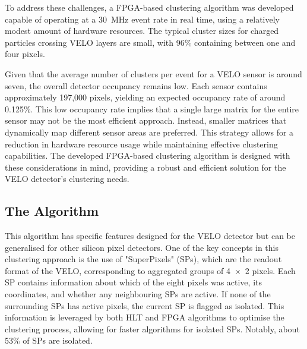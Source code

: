 To address these challenges, a FPGA-based clustering algorithm was developed capable of operating at a \SI{30}{\mega\hertz} event rate in real time, using a relatively modest amount of hardware resources. The typical cluster sizes for charged particles crossing VELO layers are small, with 96\% containing between one and four pixels. 

Given that the average number of clusters per event for a VELO sensor is around seven, the overall detector occupancy remains low. Each sensor contains approximately 197,000 pixels, yielding an expected occupancy rate of around 0.125\%\cite{Bediaga:2013tje}. This low occupancy rate implies that a single large matrix for the entire sensor may not be the most efficient approach. Instead, smaller matrices that dynamically map different sensor areas are preferred. This strategy allows for a reduction in hardware resource usage while maintaining effective clustering capabilities. The developed FPGA-based clustering algorithm is designed with these considerations in mind, providing a robust and efficient solution for the VELO detector's clustering needs.

\subsection*{The Algorithm}
This algorithm has specific features designed for the VELO detector but can be generalised for other silicon pixel detectors. One of the key concepts in this clustering approach is the use of "SuperPixels" (SPs), which are the readout format of the VELO, corresponding to aggregated groups of 4~×~2 pixels. Each SP contains information about which of the eight pixels was active, its coordinates, and whether any neighbouring SPs are active. If none of the surrounding SPs has active pixels, the current SP is flagged as isolated. This information is leveraged by both HLT and FPGA algorithms to optimise the clustering process, allowing for faster algorithms for isolated SPs. Notably, about 53\% of SPs are isolated.

